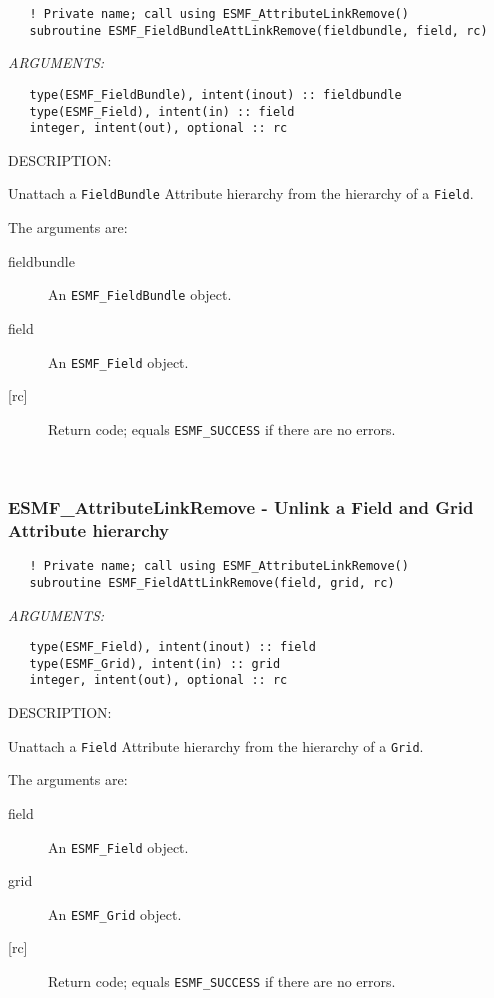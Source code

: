   
\begin{verbatim}   ! Private name; call using ESMF_AttributeLinkRemove()
   subroutine ESMF_FieldBundleAttLinkRemove(fieldbundle, field, rc)\end{verbatim}{\em ARGUMENTS:}
\begin{verbatim}   type(ESMF_FieldBundle), intent(inout) :: fieldbundle
   type(ESMF_Field), intent(in) :: field
   integer, intent(out), optional :: rc\end{verbatim}
{\sf DESCRIPTION:\\ }


   Unattach a {\tt FieldBundle} Attribute hierarchy from the hierarchy of
   a {\tt Field}.
  
   The arguments are:
   \begin{description}
   \item [fieldbundle]
   An {\tt ESMF\_FieldBundle} object.
   \item [field]
   An {\tt ESMF\_Field} object.
   \item [{[rc]}]
   Return code; equals {\tt ESMF\_SUCCESS} if there are no errors.
   \end{description}
  
   
 
\mbox{}\hrulefill\ 
 
\subsubsection [ESMF\_AttributeLinkRemove] {ESMF\_AttributeLinkRemove - Unlink a Field and Grid Attribute hierarchy}


  
\begin{verbatim}   ! Private name; call using ESMF_AttributeLinkRemove()
   subroutine ESMF_FieldAttLinkRemove(field, grid, rc)\end{verbatim}{\em ARGUMENTS:}
\begin{verbatim}   type(ESMF_Field), intent(inout) :: field
   type(ESMF_Grid), intent(in) :: grid
   integer, intent(out), optional :: rc\end{verbatim}
{\sf DESCRIPTION:\\ }


   Unattach a {\tt Field} Attribute hierarchy from the hierarchy of
   a {\tt Grid}.
  
   The arguments are:
   \begin{description}
   \item [field]
   An {\tt ESMF\_Field} object.
   \item [grid]
   An {\tt ESMF\_Grid} object.
   \item [{[rc]}]
   Return code; equals {\tt ESMF\_SUCCESS} if there are no errors.
   \end{description}
  
